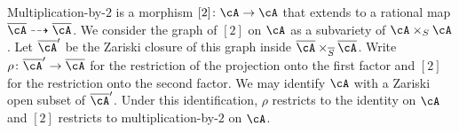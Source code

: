 





Multiplication-by-$2$ is a morphism $[2]\colon \cA\rightarrow \cA$
that extends to a rational map
$\overline{\cA}\dashrightarrow\overline{\cA}$.
We consider the graph of $[2]$ on $\cA$ as a subvariety of
$\cA\times_S\cA$.
Let $\overline{\cA}'$ be the Zariski closure of this graph inside
$\overline{\cA}\times_{\overline S}\overline{\cA}$.
 Write $\rho\colon
\overline{\cA}'\rightarrow\overline{\cA}$ for the restriction of the projection onto the
first factor and  $[2]$ for the restriction onto the second factor.
We may identify $\cA$ with a Zariski open subset of
$\overline{\cA}'$. Under this identification, $\rho$ restricts to the
identity on $\cA$ and $[2]$ restricts to multiplication-by-$2$ on
$\cA$.

